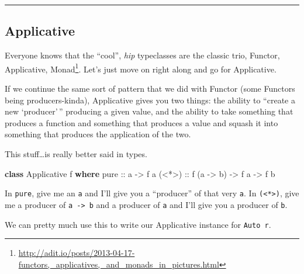 \documentclass[]{article}
\newenvironment{Shaded}{}{}
\newcommand{\DataTypeTok}[1]{\textcolor[rgb]{0.56,0.13,0.00}{#1}}
\newcommand{\KeywordTok}[1]{\textcolor[rgb]{0.00,0.44,0.13}{\textbf{#1}}}
\newcommand{\NormalTok}[1]{#1}
\newcommand{\OtherTok}[1]{\textcolor[rgb]{0.00,0.44,0.13}{#1}}
\renewcommand{\href}[2]{#2\footnote{\url{#1}}}
\begin{document}
\begin{center}\rule{0.5\linewidth}{\linethickness}\end{center}

\hypertarget{applicative}{%
\subsection{Applicative}\label{applicative}}

Everyone knows that the ``cool'', \emph{hip} typeclasses are the classic trio,
\href{http://adit.io/posts/2013-04-17-functors,_applicatives,_and_monads_in_pictures.html}{Functor,
Applicative, Monad}. Let's just move on right along and go for Applicative.

If we continue the same sort of pattern that we did with Functor (some Functors
being producers-kinda), Applicative gives you two things: the ability to
``create a new `producer'\,'' producing a given value, and the ability to take
something that produces a function and something that produces a value and
squash it into something that produces the application of the two.

This stuff\ldots is really better said in types.

\begin{Shaded}
\begin{Highlighting}[]
\KeywordTok{class} \DataTypeTok{Applicative}\NormalTok{ f }\KeywordTok{where}
\OtherTok{    pure  ::}\NormalTok{ a }\OtherTok{{-}>}\NormalTok{ f a}
\OtherTok{    (<*>) ::}\NormalTok{ f (a }\OtherTok{{-}>}\NormalTok{ b) }\OtherTok{{-}>}\NormalTok{ f a }\OtherTok{{-}>}\NormalTok{ f b}
\end{Highlighting}
\end{Shaded}

In \texttt{pure}, give me an \texttt{a} and I'll give you a ``producer'' of that
very \texttt{a}. In \texttt{(\textless{}*\textgreater{})}, give me a producer of
\texttt{a\ -\textgreater{}\ b} and a producer of \texttt{a} and I'll give you a
producer of \texttt{b}.

We can pretty much use this to write our Applicative instance for
\texttt{Auto\ r}.
\end{document}
